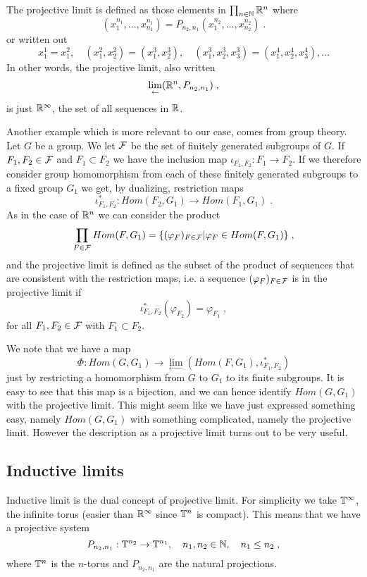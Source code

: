 \documentclass[12pt]{article}
\def\cf{{\cal F}}
\newcommand{\bbN}{{\Bbb N}}
\newcommand{\bbR}{{\Bbb R}}
\newcommand{\bbT}{{\Bbb T}}
\begin{document}
The projective limit is defined as those elements in $\prod_{n\in \bbN}\bbR^n$ where
$$(x_1^{n_1},\ldots , x_{n_1}^{n_1})= P_{n_2,n_1}(x_1^{n_2},\ldots , x_{n_2}^{n_2})\;.$$
or written out
$$x_1^1=x_1^2, \quad (x_1^2,x_2^2)=(x_1^3,x_2^3 ), \quad (x_1^3,x_2^3,x_3^3)=(x_1^4,x_2^4,x_3^4),\ldots$$
In other words, the projective limit, also written 
$$\lim_\leftarrow (\bbR^n , P_{n_2,n_1})\;,$$
is just $\bbR^\infty$, the set of all sequences in $\bbR$.

Another example which is more relevant to our case, comes from group
theory. Let $G$ be a group. We let $\cf$ be the set of finitely generated subgroups of $G$. If $F_1,F_2 \in \cf$ and $F_1\subset F_2$ we have the inclusion map $\iota_{F_1,F_2}: F_1\to F_2$. If we therefore consider group homomorphism from each of these finitely generated subgroups to a fixed group $G_1$ we get, by dualizing, restriction maps
$$\iota_{F_1,F_2}^*: Hom (F_2,G_1)\rightarrow Hom (F_1,G_1)\;.$$ 
As in the case of $\bbR^n$ we can consider the product 
$$\prod_{F\in \cf}Hom(F,G_1)=\{ (\varphi_{F})_{F\in \cf}| \varphi_{F}\in Hom(F,G_1)\}\;, $$
and the projective limit is defined as the subset of the product of sequences that are consistent with the restriction maps, i.e. a sequence $(\varphi_F)_{F\in \cf}$ is in the projective limit if 
$$\iota^*_{F_1,F_2} (\varphi_{F_2})=\varphi_{F_1}\;,$$
for all $F_1,F_2\in \cf$ with $F_1\subset F_2$.

We note that we have a  map 
$$\Phi :Hom(G,G_1)\to \lim_\leftarrow (Hom(F,G_1),\iota_{F_1,F_2}^*)$$
just by restricting a homomorphism from $G$ to $G_1$ to its finite subgroups. It is easy to see that this map is a bijection, and we can hence identify $Hom(G,G_1)$ with the projective limit. This might seem like we have just expressed something easy, namely $Hom(G,G_1)$ with something complicated, namely the projective limit. However the description as a projective limit turns out to be very useful. 

\subsection{Inductive limits}


Inductive limit is  the dual concept of projective limit. For simplicity we take $\bbT^\infty$, the infinite torus (easier than $\bbR^\infty$ since $\bbT^n$ is compact). This means that we have a projective system
$$P_{n_2,n_1} : \bbT^{n_2} \to \bbT^{n_1},\quad n_1,n_2\in \bbN, \quad n_1\leq n_2\;,$$
where $\bbT^n$ is the $n$-torus and $P_{n_2,n_1}$ are the natural projections.
\end{document}

